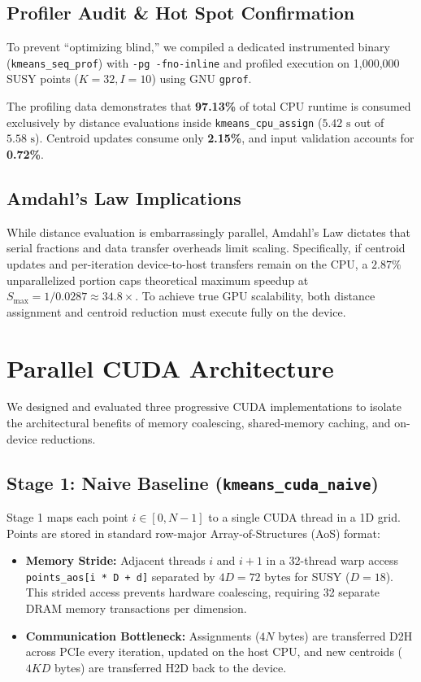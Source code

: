 \documentclass[sigconf,nonacm]{acmart}
\begin{document}
\subsection{Profiler Audit \& Hot Spot Confirmation}
To prevent ``optimizing blind,'' we compiled a dedicated instrumented binary (\texttt{kmeans\_seq\_prof}) with \texttt{-pg -fno-inline} and profiled execution on 1,000,000 SUSY points ($K=32, I=10$) using GNU \texttt{gprof}.

The profiling data demonstrates that \textbf{97.13\%} of total CPU runtime is consumed exclusively by distance evaluations inside \texttt{kmeans\_cpu\_assign} ($5.42\text{ s}$ out of $5.58\text{ s}$). Centroid updates consume only \textbf{2.15\%}, and input validation accounts for \textbf{0.72\%}.

\subsection{Amdahl's Law Implications}
While distance evaluation is embarrassingly parallel, Amdahl's Law dictates that serial fractions and data transfer overheads limit scaling. Specifically, if centroid updates and per-iteration device-to-host transfers remain on the CPU, a $2.87\%$ unparallelized portion caps theoretical maximum speedup at $S_{\max} = 1 / 0.0287 \approx 34.8\times$. To achieve true GPU scalability, both distance assignment and centroid reduction must execute fully on the device.

\section{Parallel CUDA Architecture}

We designed and evaluated three progressive CUDA implementations to isolate the architectural benefits of memory coalescing, shared-memory caching, and on-device reductions.

\subsection{Stage 1: Naive Baseline (\texttt{kmeans\_cuda\_naive})}
Stage 1 maps each point $i \in [0, N-1]$ to a single CUDA thread in a 1D grid. Points are stored in standard row-major Array-of-Structures (AoS) format:
\begin{itemize}
    \item \textbf{Memory Stride:} Adjacent threads $i$ and $i+1$ in a 32-thread warp access \texttt{points\_aos[i * D + d]} separated by $4D = 72\text{ bytes}$ for SUSY ($D=18$). This strided access prevents hardware coalescing, requiring 32 separate DRAM memory transactions per dimension.
    \item \textbf{Communication Bottleneck:} Assignments ($4N$ bytes) are transferred D2H across PCIe every iteration, updated on the host CPU, and new centroids ($4KD$ bytes) are transferred H2D back to the device.
\end{itemize}
\end{document}

